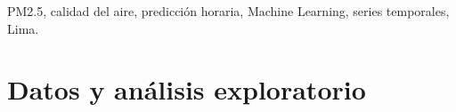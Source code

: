 \documentclass[conference]{IEEEtran}
\begin{document}
\begin{IEEEkeywords}
PM2.5, calidad del aire, predicción horaria, Machine Learning, series temporales, Lima.
\end{IEEEkeywords}



\section{Datos y análisis exploratorio}
\label{sec:eda}













\end{document}
